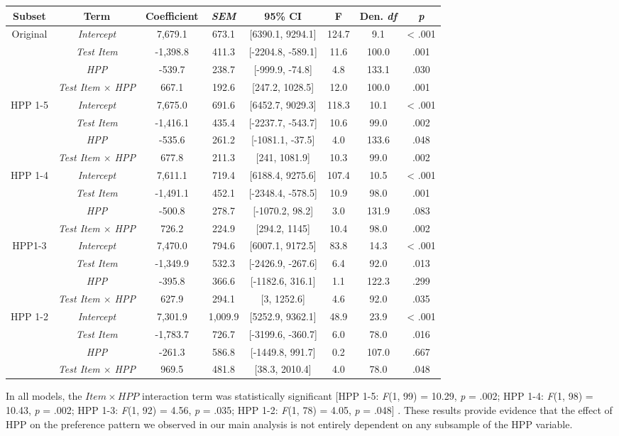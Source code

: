\begin{appendix}
\begin{longtable}[]{@{}cccccccc@{}}
\toprule
\textbf{Subset} & \textbf{Term} & \textbf{Coefficient} &
\textbf{\emph{SEM}} & \textbf{95\% CI} & \textbf{F} & \textbf{Den.
\emph{df}} & \textbf{\emph{p}}\tabularnewline
\midrule
\endhead
Original & \emph{Intercept} & 7,679.1 & 673.1 & {[}6390.1, 9294.1{]} &
124.7 & 9.1 & \textless{} .001\tabularnewline
& \emph{Test Item} & -1,398.8 & 411.3 & {[}-2204.8, -589.1{]} & 11.6 &
100.0 & .001\tabularnewline
& \emph{HPP} & -539.7 & 238.7 & {[}-999.9, -74.8{]} & 4.8 & 133.1 &
.030\tabularnewline
& \emph{Test Item \(\times\) HPP} & 667.1 & 192.6 & {[}247.2, 1028.5{]}
& 12.0 & 100.0 & .001\tabularnewline
HPP 1-5 & \emph{Intercept} & 7,675.0 & 691.6 & {[}6452.7, 9029.3{]} &
118.3 & 10.1 & \textless{} .001\tabularnewline
& \emph{Test Item} & -1,416.1 & 435.4 & {[}-2237.7, -543.7{]} & 10.6 &
99.0 & .002\tabularnewline
& \emph{HPP} & -535.6 & 261.2 & {[}-1081.1, -37.5{]} & 4.0 & 133.6 &
.048\tabularnewline
& \emph{Test Item \(\times\) HPP} & 677.8 & 211.3 & {[}241, 1081.9{]} &
10.3 & 99.0 & .002\tabularnewline
HPP 1-4 & \emph{Intercept} & 7,611.1 & 719.4 & {[}6188.4, 9275.6{]} &
107.4 & 10.5 & \textless{} .001\tabularnewline
& \emph{Test Item} & -1,491.1 & 452.1 & {[}-2348.4, -578.5{]} & 10.9 &
98.0 & .001\tabularnewline
& \emph{HPP} & -500.8 & 278.7 & {[}-1070.2, 98.2{]} & 3.0 & 131.9 &
.083\tabularnewline
& \emph{Test Item \(\times\) HPP} & 726.2 & 224.9 & {[}294.2, 1145{]} &
10.4 & 98.0 & .002\tabularnewline
HPP1-3 & \emph{Intercept} & 7,470.0 & 794.6 & {[}6007.1, 9172.5{]} &
83.8 & 14.3 & \textless{} .001\tabularnewline
& \emph{Test Item} & -1,349.9 & 532.3 & {[}-2426.9, -267.6{]} & 6.4 &
92.0 & .013\tabularnewline
& \emph{HPP} & -395.8 & 366.6 & {[}-1182.6, 316.1{]} & 1.1 & 122.3 &
.299\tabularnewline
& \emph{Test Item \(\times\) HPP} & 627.9 & 294.1 & {[}3, 1252.6{]} &
4.6 & 92.0 & .035\tabularnewline
HPP 1-2 & \emph{Intercept} & 7,301.9 & 1,009.9 & {[}5252.9, 9362.1{]} &
48.9 & 23.9 & \textless{} .001\tabularnewline
& \emph{Test Item} & -1,783.7 & 726.7 & {[}-3199.6, -360.7{]} & 6.0 &
78.0 & .016\tabularnewline
& \emph{HPP} & -261.3 & 586.8 & {[}-1449.8, 991.7{]} & 0.2 & 107.0 &
.667\tabularnewline
& \emph{Test Item \(\times\) HPP} & 969.5 & 481.8 & {[}38.3, 2010.4{]} &
4.0 & 78.0 & .048\tabularnewline
\bottomrule
\end{longtable}

In all models, the \(Item \times HPP\) interaction term was
statistically significant {[}HPP 1-5: \emph{F}(1, 99) = 10.29, \emph{p}
= .002; HPP 1-4: \emph{F}(1, 98) = 10.43, \emph{p} = .002; HPP 1-3:
\emph{F}(1, 92) = 4.56, \emph{p} = .035; HPP 1-2: \emph{F}(1, 78) =
4.05, \emph{p} = .048{]} . These results provide evidence that the
effect of HPP on the preference pattern we observed in our main analysis
is not entirely dependent on any subsample of the HPP variable.


\end{appendix}
